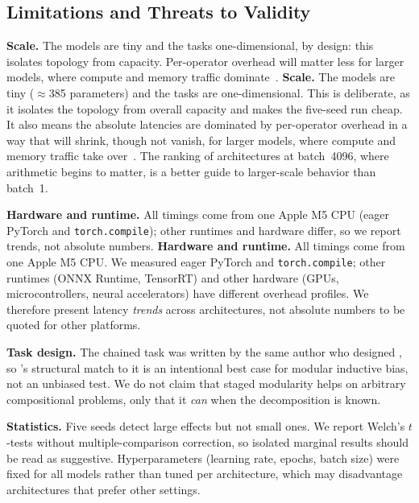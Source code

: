 \subsection{Limitations and Threats to Validity}
\ifcompact
\textbf{Scale.} The models are tiny and the tasks one-dimensional, by design: this isolates topology from capacity. Per-operator
overhead will matter less for larger models, where compute and memory traffic dominate~\cite{sze2017efficient}.
\else
\textbf{Scale.} The models are tiny ($\approx$385 parameters) and the tasks are one-dimensional. This is
deliberate, as it isolates the topology from overall capacity and makes the five-seed run cheap. It also means the
absolute latencies are dominated by per-operator overhead in a way that will shrink, though not vanish, for larger
models, where compute and memory traffic take over~\cite{sze2017efficient}. The ranking of architectures at
batch~4096, where arithmetic begins to matter, is a better guide to larger-scale behavior than batch~1.
\fi

\ifcompact
\textbf{Hardware and runtime.} All timings come from one Apple M5 CPU (eager PyTorch and \texttt{torch.compile}); other
runtimes and hardware differ, so we report trends, not absolute numbers.
\else
\textbf{Hardware and runtime.} All timings come from one Apple M5 CPU. We measured eager PyTorch and
\texttt{torch.compile}; other runtimes (ONNX Runtime, TensorRT) and other hardware (GPUs, microcontrollers, neural
accelerators) have different overhead profiles. We therefore present latency \emph{trends} across architectures, not
absolute numbers to be quoted for other platforms.
\fi

\textbf{Task design.} The chained task was written by the same author who designed \HB, so \HB's structural
match to it is an intentional best case for modular inductive bias, not an unbiased test. We do not claim
that staged modularity helps on arbitrary compositional problems, only that it \emph{can} when the
decomposition is known.

\textbf{Statistics.} Five seeds detect large effects but not small ones. We report Welch's $t$-tests
without multiple-comparison correction, so isolated marginal results should be read as suggestive.
Hyperparameters (learning rate, epochs, batch size) were fixed for all models rather than tuned per
architecture, which may disadvantage architectures that prefer other settings.
